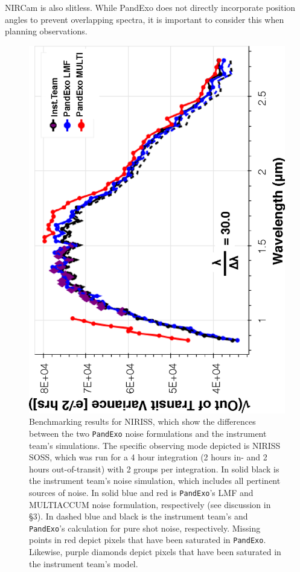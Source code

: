 \documentclass[iop]{emulateapj}
\begin{document}
NIRCam is also slitless. While PandExo does not directly incorporate position angles to prevent overlapping spectra, it is important to consider this when planning observations. 
\begin{figure}[ht]
 \includegraphics[angle=270,origin=c,width=\linewidth]{fig5.eps}
\caption{Benchmarking results for NIRISS, which show the differences between the two \texttt{PandExo} noise formulations and the instrument team's simulations. The specific observing mode depicted is NIRISS SOSS, which was run for a 4 hour integration (2 hours in- and 2 hours out-of-transit) with 2 groups per integration. In solid black is the instrument team's noise simulation, which includes all pertinent sources of noise. In solid blue and red is \texttt{PandExo}'s LMF and MULTIACCUM noise formulation, respectively (see discussion in \S3). In dashed blue and black is the instrument team's and \texttt{PandExo}'s calculation for pure shot noise, respectively. Missing points in red depict pixels that have been saturated in \texttt{PandExo}. Likewise, purple diamonds depict pixels that have been saturated in the instrument team's model. \label{fig5}}
\end{figure}
\end{document}
